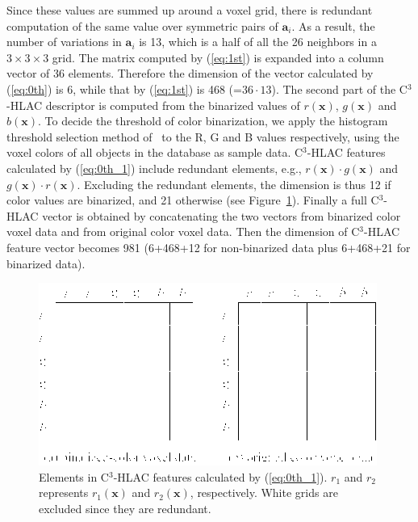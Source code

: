 \documentclass[letterpaper, 10 pt, conference]{sty/ieeeconf}
\begin{document}
%
Since these values are summed up around a voxel grid, there is redundant computation of the 
same value over symmetric pairs of ${\bm a_i}$. 
As a result, the number of variations in ${\bm a_i}$ is 13, which is a half of all the 26 neighbors in a $3\times3\times3$ grid.
The matrix computed by (\ref{eq:1st}) is expanded into a column vector of 36 elements.
Therefore the dimension of the vector calculated by (\ref{eq:0th}) is 6, while that by 
(\ref{eq:1st}) is 468 (=$36\cdot13$).
The second part of the C$^3$-HLAC descriptor is computed from the binarized values of $r(\bm{x})$, $g(\bm{x})$ 
and $b(\bm{x})$. 
To decide the threshold of color binarization, 
    we apply the histogram threshold selection method of~\cite{otsu1979} to the R, G and B values respectively, 
    using the voxel colors of all objects in the database as sample data.
C$^3$-HLAC features calculated by (\ref{eq:0th_1}) include redundant elements, e.g., $r(\bm{x})\cdot g(\bm{x})$ and $g(\bm{x})\cdot r(\bm{x})$.
Excluding the redundant elements, the dimension is thus 12 if color values are binarized, and 21 otherwise (see Figure~\ref{fig:eq3_colorCHLAC}). 
Finally a full C$^3$-HLAC vector is obtained by concatenating the two vectors from binarized 
color voxel data and from original color voxel data. Then the dimension of C$^3$-HLAC feature vector 
becomes 981 (6+468+12 for non-binarized data plus 6+468+21 for binarized data). 

\begin{figure}[tb!]
  \begin{center}
    \includegraphics[width=.99\columnwidth]{figures/colorCHLAC/Eq3_in_colorCHLAC.png}
  \caption{Elements in C$^3$-HLAC features calculated by (\ref{eq:0th_1}). $r_1$ and $r_2$ represents $r_1(\bm{x})$ and $r_2(\bm{x})$, respectively. White grids are excluded since they are redundant.}
  \label{fig:eq3_colorCHLAC}
\end{center}
\end{figure}
\end{document}
